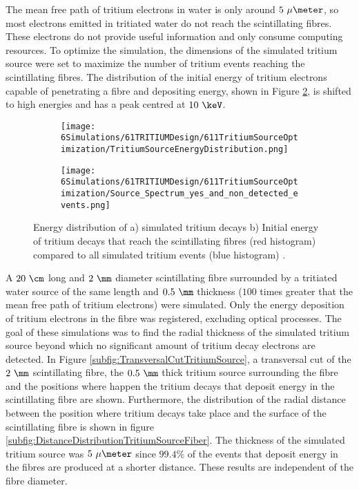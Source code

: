 The mean free path of tritium electrons in water is only around $5~\mu\meter$, so most electrons emitted in tritiated water do not reach the scintillating fibres. These electrons do not provide useful information and only consume computing resources. To optimize the simulation, the dimensions of the simulated tritium source were set to maximize the number of tritium events reaching the scintillating fibres. The distribution of the initial energy of tritium electrons capable of penetrating a fibre and depositing energy, shown in Figure \ref{subfig:EnergySpectrumEventsDetectedandNonDetected}, is shifted to high energies and has a peak centred at $10~\keV$. 

\begin{figure}
\centering
    \begin{subfigure}[b]{0.6\textwidth}
    \centering
    \texttt{[image: 6Simulations/61TRITIUMDesign/611TritiumSourceOptimization/TritiumSourceEnergyDistribution.png]}  
    \caption{\label{subfig:EnergyDistributionTritiumSource}}
    \end{subfigure}
    \hfill
    \begin{subfigure}[b]{0.6\textwidth}
    \centering
    \texttt{[image: 6Simulations/61TRITIUMDesign/611TritiumSourceOptimization/Source\_Spectrum\_yes\_and\_non\_detected\_events.png]}  
    \caption{\label{subfig:EnergySpectrumEventsDetectedandNonDetected}}
    \end{subfigure}
 \caption{Energy distribution of a) simulated tritium decays b) Initial energy of tritium decays that reach the scintillating fibres (red histogram) compared to all simulated tritium events (blue histogram) \cite{SimulationPaperCarlos}.
 \label{fig:TritiumSourceOptimization}}
\end{figure}

A $20~\cm$ long and $2~\mm$ diameter scintillating fibre surrounded by a tritiated water source of the same length and $0.5~\mm$ thickness ($100$ times greater that the mean free path of tritium electrons) were simulated. Only the energy deposition of tritium electrons in the fibre was registered, excluding optical processes. The goal of these simulations was to find the radial thickness of the simulated tritium source beyond which no significant amount of tritium decay electrons are detected. In Figure \ref{subfig:TransversalCutTritiumSource}, a transversal cut of the $2~\mm$ scintillating fibre, the $0.5~\mm$ thick tritium source surrounding the fibre and the positions where happen the tritium decays that deposit energy in the scintillating fibre are shown. Furthermore, the distribution of the radial distance between the position where tritium decays take place and the surface of the scintillating fibre is shown in figure \ref{subfig:DistanceDistributionTritiumSourceFiber}. The thickness of the simulated tritium source was $5~\mu\meter$ since $99.4\%$ of the events that deposit energy in the fibres are produced at a shorter distance. These results are independent of the fibre diameter.

